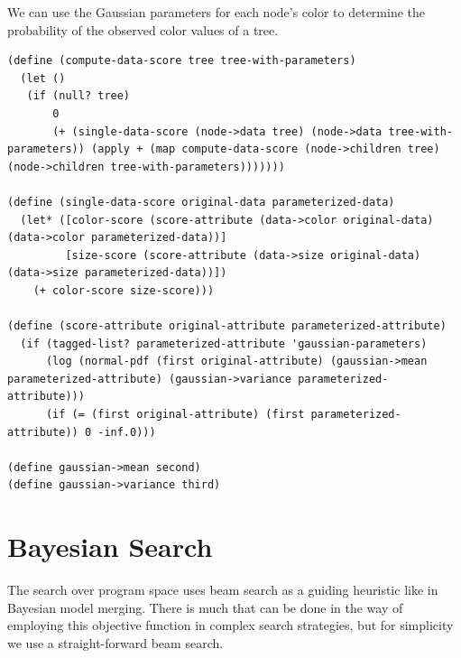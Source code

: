 \documentclass[a4paper,10pt]{article}
\begin{document}
We can use the Gaussian parameters for each node's color to determine the probability of the observed color values of a tree.
\begin{lstlisting}[frame=trBL]
(define (compute-data-score tree tree-with-parameters)
  (let ()
   (if (null? tree)
       0
       (+ (single-data-score (node->data tree) (node->data tree-with-parameters)) (apply + (map compute-data-score (node->children tree) (node->children tree-with-parameters)))))))

(define (single-data-score original-data parameterized-data)
  (let* ([color-score (score-attribute (data->color original-data) (data->color parameterized-data))]
         [size-score (score-attribute (data->size original-data) (data->size parameterized-data))])
    (+ color-score size-score)))

(define (score-attribute original-attribute parameterized-attribute)
  (if (tagged-list? parameterized-attribute 'gaussian-parameters)
      (log (normal-pdf (first original-attribute) (gaussian->mean parameterized-attribute) (gaussian->variance parameterized-attribute)))
      (if (= (first original-attribute) (first parameterized-attribute)) 0 -inf.0)))

(define gaussian->mean second)
(define gaussian->variance third)

\end{lstlisting}

\section{Bayesian Search}
The search over program space uses beam search as a guiding heuristic like in Bayesian model merging.  There is much that can be done in the way of employing this objective function in complex search strategies, but for simplicity we use a straight-forward beam search.  
\end{document}
